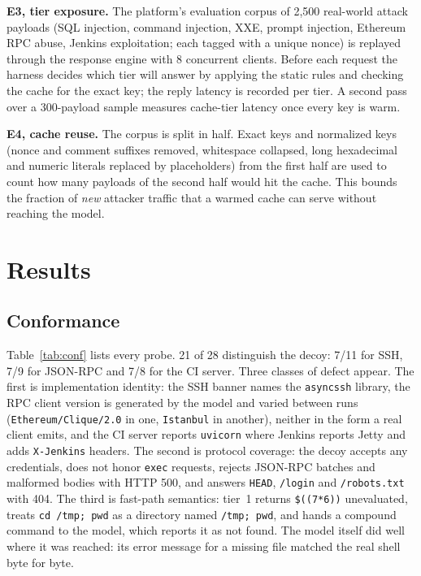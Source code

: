 \documentclass[conference]{IEEEtran}
\begin{document}
\textbf{E3, tier exposure.} The platform's evaluation corpus of 2,500 real-world attack payloads (SQL injection, command injection, XXE, prompt injection, Ethereum RPC abuse, Jenkins exploitation; each tagged with a unique nonce) is replayed through the response engine with 8 concurrent clients. Before each request the harness decides which tier will answer by applying the static rules and checking the cache for the exact key; the reply latency is recorded per tier. A second pass over a 300-payload sample measures cache-tier latency once every key is warm.

\textbf{E4, cache reuse.} The corpus is split in half. Exact keys and normalized keys (nonce and comment suffixes removed, whitespace collapsed, long hexadecimal and numeric literals replaced by placeholders) from the first half are used to count how many payloads of the second half would hit the cache. This bounds the fraction of \emph{new} attacker traffic that a warmed cache can serve without reaching the model.

\section{Results}
\label{sec:results}

\subsection{Conformance}
\label{sec:res-conf}
Table~\ref{tab:conf} lists every probe. 21 of 28 distinguish the decoy: 7/11 for SSH, 7/9 for JSON-RPC and 7/8 for the CI server. Three classes of defect appear. The first is implementation identity: the SSH banner names the \texttt{asyncssh} library, the RPC client version is generated by the model and varied between runs (\texttt{Ethereum/Clique/2.0} in one, \texttt{Istanbul} in another), neither in the form a real client emits, and the CI server reports \texttt{uvicorn} where Jenkins reports Jetty and adds \texttt{X-Jenkins} headers. The second is protocol coverage: the decoy accepts any credentials, does not honor \texttt{exec} requests, rejects JSON-RPC batches and malformed bodies with HTTP 500, and answers \texttt{HEAD}, \texttt{/login} and \texttt{/robots.txt} with 404. The third is fast-path semantics: tier~1 returns \texttt{\$((7*6))} unevaluated, treats \texttt{cd /tmp; pwd} as a directory named \texttt{/tmp; pwd}, and hands a compound command to the model, which reports it as not found. The model itself did well where it was reached: its error message for a missing file matched the real shell byte for byte.
\end{document}
